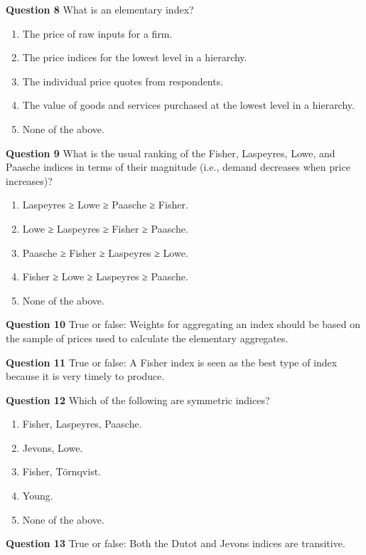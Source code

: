 \documentclass[]{article}
\begin{document}
\textbf{Question 8} What is an elementary index?

\begin{enumerate}
\def\labelenumi{\alph{enumi})}
\item
  The price of raw inputs for a firm.
\item
  The price indices for the lowest level in a hierarchy.
\item
  The individual price quotes from respondents.
\item
  The value of goods and services purchased at the lowest level in a hierarchy.
\item
  None of the above.
\end{enumerate}

\textbf{Question 9} What is the usual ranking of the Fisher, Laspeyres, Lowe, and Paasche indices in terms of their magnitude (i.e., demand decreases when price increases)?

\begin{enumerate}
\def\labelenumi{\alph{enumi})}
\item
  Laspeyres ≥ Lowe ≥ Paasche ≥ Fisher.
\item
  Lowe ≥ Laspeyres ≥ Fisher ≥ Paasche.
\item
  Paasche ≥ Fisher ≥ Laspeyres ≥ Lowe.
\item
  Fisher ≥ Lowe ≥ Laspeyres ≥ Paasche.
\item
  None of the above.
\end{enumerate}

\textbf{Question 10} True or false: Weights for aggregating an index should be based on the sample of prices used to calculate the elementary aggregates.

\textbf{Question 11} True or false: A Fisher index is seen as the best type of index because it is very timely to produce.

\textbf{Question 12} Which of the following are symmetric indices?

\begin{enumerate}
\def\labelenumi{\alph{enumi})}
\item
  Fisher, Laspeyres, Paasche.
\item
  Jevons, Lowe.
\item
  Fisher, Törnqvist.
\item
  Young.
\item
  None of the above.
\end{enumerate}

\textbf{Question 13} True or false: Both the Dutot and Jevons indices are transitive.
\end{document}
